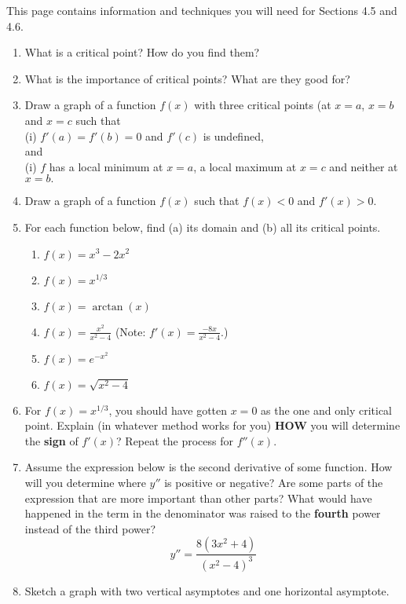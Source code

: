 \documentclass[12pt]{article}
\renewcommand{\emph}[1]{\textsf{\textbf{#1}}}
\begin{document}
\addtolength\itemsep{-1mm}

This page contains information and techniques you will need for Sections 4.5 and 4.6.\\
\begin{enumerate}
\item What is a critical point? How do you find them?
\vspace{.5in}
\item What is the importance of critical points? What are they good for?
\vspace{.5in}
\item Draw a graph of a function $f(x)$ with three critical points (at $x=a$, $x=b$ and $x=c$ such that \\
(i) $f'(a)=f'(b)=0$ and $f'(c)$ is undefined,\\
and\\
(i) $f$ has a local minimum at $x=a$, a local maximum at $x=c$ and neither at $x=b.$
\vfill
\item Draw a graph of a function $f(x)$ such that $f(x)<0$ and $f'(x) >0.$
\vfill
\newpage
\item For each function below, find (a) its domain and (b) all its critical points.
	\begin{enumerate}
	\item $f(x)=x^3-2x^2$
	\vfill
	\item $f(x)=x^{1/3}$
	\vfill
	\item $f(x)=\arctan(x)$
	\vfill
	\item $f(x)=\frac{x^2}{x^2-4}$ (Note: $f'(x)=\frac{-8x}{x^2-4}.$)
	\vfill
	\item $f(x)=e^{-x^2}$
	\vfill
	\item $f(x)=\sqrt{x^2-4}$
	\vfill
	\end{enumerate}
\newpage
\item For $f(x)=x^{1/3}$, you should have gotten $x=0$ as the one and only critical point. Explain (in whatever method works for you) \emph{HOW} you will determine the \emph{sign} of $f'(x)$? Repeat the process for $f''(x).$
\vfill
\item Assume the expression below is the second derivative of some function. How will you determine where $y''$ is positive or negative? Are some parts of the expression that are more important than other parts? What would have happened in the term in the denominator was raised to the \emph{fourth} power instead of the third power?\\
$$y''=\frac{8(3x^2+4)}{(x^2-4)^3}$$
\vfill
\item Sketch a graph with two vertical asymptotes and one horizontal asymptote.

\end{enumerate}
\end{document}

